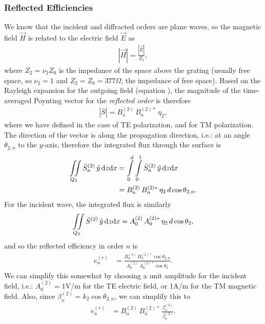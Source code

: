 \subsubsection{Reflected Efficiencies}
We know that the incident and diffracted orders are plane waves, so the magnetic field $\vec H$ is related to the electric field $\vec E$ as
\begin{align}
\left| \vec H \right| = \frac{\left| \vec E \right|}{Z_2},
\end{align}
where $Z_2 = \nu_2 Z_0$ is the impedance of the space above the grating (usually free space, so $\nu_2=1$ and $Z_2 = Z_0 = 377\Omega$, the impedance of free space). Based on the Rayleigh expansion for the outgoing field (equation ), the magnitude of the time-averaged Poynting vector for the \emph{reflected order} is therefore
\begin{align}
\left| \bar S \right| = B_n^{(2)} \, B_n^{(2)\ast} \, \eta_2,
\end{align}
where we have defined  in the case of TE polarization, and  for TM polarization.  The direction of the vector is along the propagation direction, i.e.: at an angle $\theta_{2,n}$ to the $y$-axis, therefore the integrated flux through the surface is
\begin{align}
\iint \limits_{Q_2} \bar S_n^{(2)} \, \hat y \, \mathrm{d} z \mathrm{d} x &= \int \limits_0^d \int \limits_0^1 \bar S_n^{(2)} \, \hat y \, \mathrm{d} z \mathrm{d} x \\
&= B_n^{(2)} \, B_n^{(2)\ast} \, \eta_2 \, d \cos \theta_{2,n} .
\end{align}
For the incident wave, the integrated flux is similarly 
\begin{align}
\iint \limits_{Q_2} \bar S^{(2)} \, \hat y \, \mathrm{d} z \mathrm{d} x = A_0^{(2)} \, A_0^{(2)\ast} \, \eta_2 \, d \cos \theta_{2} ,
\end{align}
and so the reflected efficiency in order $n$ is
\begin{align}
e_n^{(r)} &= \frac{    B_n^{(2)} \, B_n^{(2)\ast} \cos \theta_{2,n}       }{    A_0^{(2)} \, A_0^{(2)\ast}  \cos \theta_{2}     }.
\end{align}
We can simplify this somewhat by choosing a unit amplitude for the incident field, i.e.: $A_0^{(2)} = 1$V/m for the TE electric field, or 1A/m for the TM magnetic field. Also, since $\beta_n^{(2)} = k_2 \cos \theta_{2,n}$, we can simplify this to
\begin{align}
e_n^{(r)} &= B_n^{(2)} \, B_n^{(2)\ast} \, \frac{     \beta_n^{(2)}       }{    \beta_0^{(2)}      }.
\label{eqnEffR}
\end{align}



